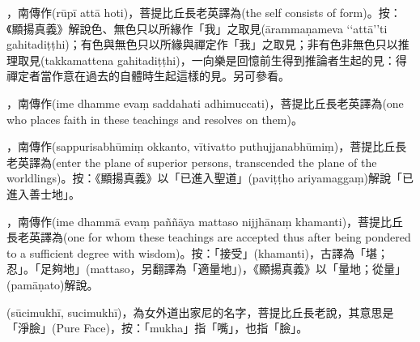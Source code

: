 \startitemgroup[noteitems]
\item{}，南傳作(rūpī attā hoti)，菩提比丘長老英譯為(the self consists of form)。按：《顯揚真義》解說色、無色只以所緣作「我」之取見(ārammaṇameva ‘‘attā’’ti gahitadiṭṭhi)；有色與無色只以所緣與禪定作「我」之取見；非有色非無色只以推理取見(takkamattena gahitadiṭṭhi)，一向樂是回憶前生得到推論者生起的見：得禪定者當作意在過去的自體時生起這樣的見。另可參看。
\stopitemgroup

\startitemgroup[noteitems]
\item{}，南傳作(ime dhamme evaṃ saddahati adhimuccati)，菩提比丘長老英譯為(one who places faith in these teachings and resolves on them)。
\stopitemgroup

\startitemgroup[noteitems]
\item{}，南傳作(sappurisabhūmiṃ okkanto, vītivatto puthujjanabhūmiṃ)，菩提比丘長老英譯為(enter the plane of superior persons, transcended the plane of the worldlings)。按：《顯揚真義》以「已進入聖道」(paviṭṭho ariyamaggaṃ)解說「已進入善士地」。
\stopitemgroup

\startitemgroup[noteitems]
\item{}，南傳作(ime dhammā evaṃ paññāya mattaso nijjhānaṃ khamanti)，菩提比丘長老英譯為(one for whom these teachings are accepted thus after being pondered to a sufficient degree with wisdom)。按：「接受」(khamanti)，古譯為「堪；忍」。「足夠地」(mattaso，另翻譯為「適量地」)，《顯揚真義》以「量地；從量」(pamāṇato)解說。
\stopitemgroup

\startitemgroup[noteitems]
\item{}(sūcimukhī, sucimukhī)，為女外道出家尼的名字，菩提比丘長老說，其意思是「淨臉」(Pure Face)，按：「mukha」指「嘴」，也指「臉」。
\stopitemgroup

